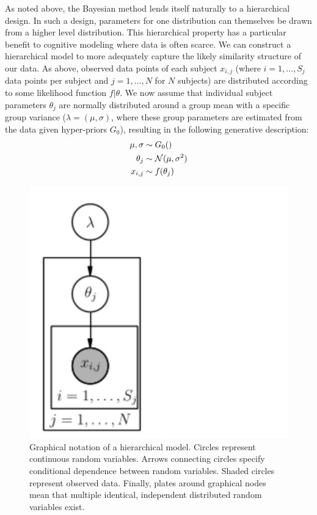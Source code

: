 \documentclass[letterpaper,10pt,english]{sphinxmanual}
\begin{document}
As noted above, the Bayesian method lends itself naturally to a
hierarchical design. In such a design, parameters for one distribution
can themselves be drawn from a higher level distribution. This
hierarchical property has a particular benefit to cognitive modeling
where data is often scarce. We can construct a hierarchical model to
more adequately capture the likely similarity structure of our
data. As above, observed data points of each subject $x_{i,j}$
(where $i = 1, \dots, S_j$ data points per subject and $j
= 1, \dots, N$ for $N$ subjects) are distributed according to
some likelihood function $f | \theta$.  We now assume that
individual subject parameters $\theta_j$ are normally
distributed around a group mean with a specific group variance
($\lambda = (\mu, \sigma)$, where these group parameters are
estimated from the data given hyper-priors $G_0$), resulting in
the following generative description:
\begin{gather}
\begin{split}\mu, \sigma &\sim G_0() \\
\theta_j &\sim \mathcal{N}(\mu, \sigma^2) \\
x_{i, j} &\sim f(\theta_j)\end{split}\notag
\end{gather}\begin{figure}[htbp]
\centering
\capstart

\includegraphics[scale=.6]{graphical_hierarchical.pdf}
\caption{Graphical notation of a hierarchical model. Circles represent
continuous random variables. Arrows connecting circles specify
conditional dependence between random variables. Shaded circles
represent observed data. Finally, plates around graphical nodes
mean that multiple identical, independent distributed random
variables exist.}\end{figure}
\end{document}
